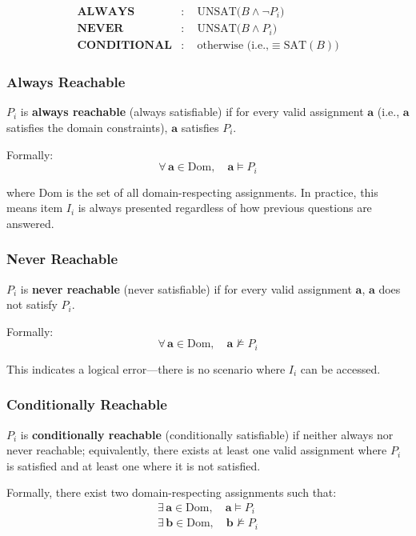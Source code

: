\[
\begin{aligned}
\textbf{ALWAYS} &:\quad \mathrm{UNSAT}\bigl(B \wedge \lnot P_i\bigr) \\
\textbf{NEVER}  &:\quad \mathrm{UNSAT}\bigl(B \wedge P_i\bigr) \\
\textbf{CONDITIONAL} &:\quad \text{otherwise (i.e.,} \equiv\mathrm{SAT}(B) \text{)}
\end{aligned}
\]

\subsubsection{Always Reachable}

$P_i$ is \textbf{always reachable} (always satisfiable) if for every valid assignment $\mathbf{a}$ (i.e., $\mathbf{a}$ satisfies the domain constraints), $\mathbf{a}$ satisfies $P_i$.

Formally:
\[
    \forall\,\mathbf{a} \in \mathrm{Dom}, \quad \mathbf{a} \models P_i
\]

where $\mathrm{Dom}$ is the set of all domain-respecting assignments. In practice, this means item $I_i$ is always presented regardless of how previous questions are answered.

\subsubsection{Never Reachable}

$P_i$ is \textbf{never reachable} (never satisfiable) if for every valid assignment $\mathbf{a}$, $\mathbf{a}$ does not satisfy $P_i$.

Formally:
\[
    \forall\,\mathbf{a} \in \mathrm{Dom}, \quad \mathbf{a} \not\models P_i
\]

This indicates a logical error—there is no scenario where $I_i$ can be accessed.

\subsubsection{Conditionally Reachable}

$P_i$ is \textbf{conditionally reachable} (conditionally satisfiable) if neither always nor never reachable; equivalently, there exists at least one valid assignment where $P_i$ is satisfied and at least one where it is not satisfied.

Formally, there exist two domain-respecting assignments such that:
\[
\begin{array}{l}
\exists\,\mathbf{a} \in \mathrm{Dom}, \quad \mathbf{a} \models P_i \\
\exists\,\mathbf{b} \in \mathrm{Dom}, \quad \mathbf{b} \not\models P_i
\end{array}
\]

